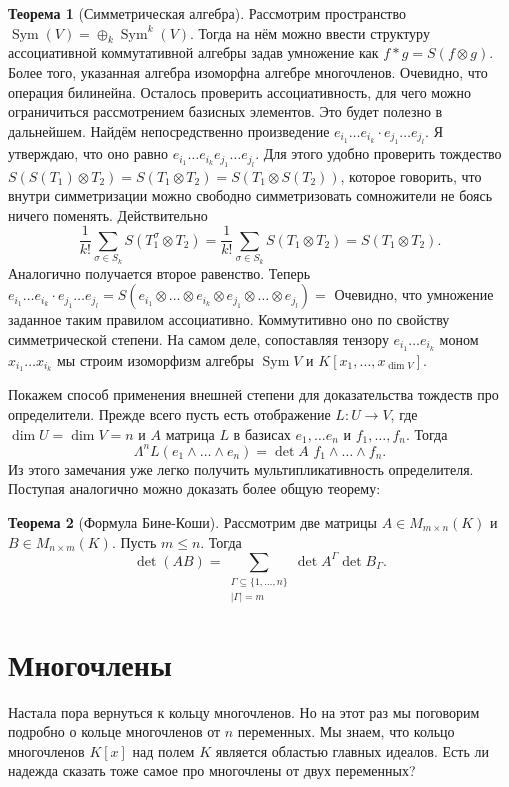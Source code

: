 \documentclass[10pt,a4paper,oneside]{book}
\theoremstyle{definition}
\newtheorem{thm}{{\color{red!40!black} Теорема}}
\newcommand{\Sym}{\operatorname{Sym}}
\def\thrm{\begin{thm}}
\def\ethrm{\end{thm}}
\begin{document}
\thrm[Симметрическая алгебра] Рассмотрим пространство $\Sym(V)=\oplus_k \Sym^k(V)$. Тогда на нём можно ввести структуру ассоциативной коммутативной алгебры задав умножение как $ f*g= S(f\otimes g)$. Более того, указанная алгебра изоморфна алгебре многочленов.
\proof Очевидно, что операция билинейна. Осталось проверить ассоциативность, для чего можно ограничиться рассмотрением базисных элементов. Это будет полезно в дальнейшем. Найдём непосредственно произведение $e_{i_1}\dots e_{i_k}\cdot e_{j_1}\dots e_{j_l}$. Я утверждаю, что оно равно $e_{i_1}\dots e_{i_k} e_{j_1}\dots e_{j_l}$.
Для этого удобно проверить тождество $S(S(T_1)\otimes T_2)= S(T_1\otimes T_2)= S(T_1 \otimes S(T_2))$, которое говорить, что внутри симметризации можно свободно симметризовать сомножители не боясь ничего поменять. Действительно
$$\frac{1}{k!}\sum_{\sigma \in S_{k}} S(T_1^{\sigma}\otimes T_2)=\frac{1}{k!}\sum_{\sigma \in S_{k}} S(T_1\otimes T_2)=S(T_1 \otimes T_2).$$
Аналогично получается второе равенство.
Теперь $e_{i_1}\dots e_{i_k}\cdot e_{j_1}\dots e_{j_l}= S(e_{i_1}\otimes\dots \otimes e_{i_k}\otimes e_{j_1}\otimes \dots\otimes e_{j_l})=$
Очевидно, что умножение заданное таким правилом ассоциативно. Коммутитивно оно по свойству симметрической степени. На самом деле, сопоставляя тензору $e_{i_1}\dots e_{i_k}$ моном $x_{i_1}\dots x_{i_k}$ мы строим изоморфизм алгебры $\Sym V$ и $K[x_1,\dots,x_{\dim V}]$.
\endproof
\ethrm




Покажем способ применения внешней степени для доказательства тождеств про определители. Прежде всего пусть есть отображение $L \colon U \to V$, где $\dim U= \dim V = n$ и $A$ матрица $L$ в базисах $e_1,\dots e_n$ и $f_1,\dots,f_n$. Тогда $$\Lambda^n L(e_1\wedge \dots \wedge e_n) = \det A \,\,f_1 \wedge \dots \wedge f_n.$$
Из этого замечания уже легко получить мультипликативность определителя. Поступая аналогично можно доказать более общую теорему:
 
\thrm[Формула Бине-Коши] Рассмотрим две матрицы $A\in M_{m\times n}(K)$ и $B\in M_{n\times m}(K)$. Пусть $m\leq n$. Тогда
$$\det(AB)=\sum_{\substack{\Gamma \subseteq \{1,\dots,n\}\\ |\Gamma|=m}} \det A^{\Gamma} \det B_{\Gamma}.$$
\ethrm







\chapter{Многочлены}
Настала пора вернуться к кольцу многочленов. Но на этот раз мы поговорим подробно о кольце многочленов от $n$ переменных. Мы знаем, что кольцо многочленов $K[x]$ над полем $K$ является областью главных идеалов. Есть ли надежда сказать тоже самое про многочлены от двух переменных? 
\end{document}
